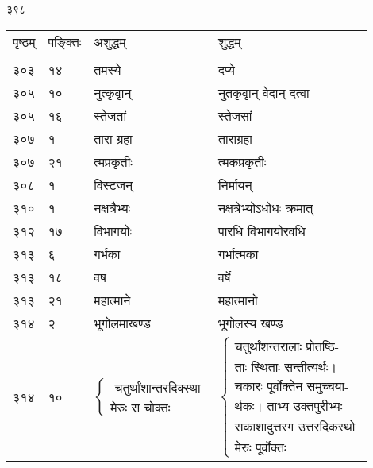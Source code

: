 \documentclass[11pt, openany]{book}
\begin{document}
\newpage

\begin{center}
 ३९८ 
\end{center}

\begin{longtable}{p{1cm} p{1.5cm} p{4cm} p{4cm}}
पृष्ठम् & पङ्क्तिः & अशुद्धम् & शुद्धम्\\
\vspace{2mm}\\

 ३०३ & १४ & तमस्ये & दप्ये \\

 ३०५ & १० & नुत्कृवृान् & नुतकृवृान् वेदान् दत्वा \\

 ३०५ & १६ & स्तेजतां & स्तेजसां \\

 ३०७ & १ & तारा ग्रहा & ताराग्रहा \\

 ३०७ & २१ & त्मप्रकृतीः & त्मकप्रकृतीः \\

 ३०८ & १ & विस्टजन् & निर्मायन् \\

 ३१० & १ & नक्षत्रैभ्यः & नक्षत्रेभ्योऽधोधः क्रमात् \\

 ३१२ & १७ & विभागयोः & पारधि विभागयोरवधि \\

 ३१३ & ६ & गर्भका & गर्भात्मका \\

 ३१३ & १८ & वष & वर्षे \\

 ३१३ & २१ & महात्माने & महात्मानो \\

 ३१४ & २ & भूगोलमाखण्ड & भूगोलस्य खण्ड \\

३१४ & १० &$\begin{cases}\mbox{ चतुर्थांशान्तरदिक्स्था}\\ \mbox{मेरुः स चोक्तः}\end{cases}$ & $\begin{cases}\mbox{चतुर्थांशन्तरालाः प्रोतष्ठि-}\\
\mbox{ताः स्थिताः सन्तीत्यर्थः।}\\
\mbox{चकारः पूर्वोक्तेन समुच्चया-}\\
\mbox{र्थकः। ताभ्य उक्तपुरीभ्यः}\\
\mbox{सकाशादुत्तरग उत्तरदिकस्थो}\\
\mbox{मेरुः पूर्वोक्तः }\end{cases}$\\


\end{longtable}
\end{document}
